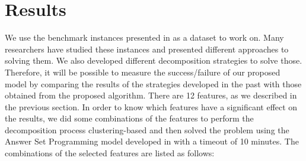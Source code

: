 \documentclass[runningheads]{llncs}
\begin{document}
\section{Results}
We use the benchmark instances presented in \cite{taillard1993benchmarks} as a dataset to work on. Many researchers have studied these instances and presented different approaches to solving them. We also developed different decomposition strategies to solve those. Therefore, it will be possible to measure the success/failure of our proposed model by comparing the results of the strategies developed in the past with those obtained from the proposed algorithm. There are 12 features, as we described in the previous section. In order to know which features have a significant effect on the results, we did some combinations of the features to perform the decomposition process clustering-based and then solved the problem using the Answer Set Programming model developed in \cite{el2020job} with a timeout of 10 minutes. The combinations of the selected features are listed as follows:
\end{document}
